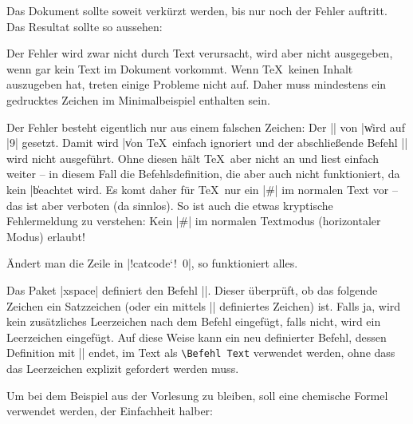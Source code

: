 
Das Dokument sollte soweit verkürzt werden, bis nur noch der Fehler auftritt. Das Resultat sollte so aussehen:
Der Fehler wird zwar nicht durch Text verursacht, wird aber nicht ausgegeben, wenn gar kein Text im Dokument vorkommt. Wenn \TeX\ keinen Inhalt auszugeben hat, treten einige Probleme nicht auf. Daher muss mindestens ein gedrucktes Zeichen im Minimalbeispiel enthalten sein.
\stopsolution

Der Fehler besteht eigentlich nur aus einem falschen Zeichen: Der |\catcode| von |\| wird auf |9| gesetzt. Damit wird |\| von \TeX\ einfach ignoriert und der abschließende Befehl |\enddocument| wird nicht ausgeführt. Ohne diesen hält \TeX\ aber nicht an und liest einfach weiter – in diesem Fall die Befehlsdefinition, die aber auch nicht funktioniert, da kein |\| beachtet wird. Es komt daher für \TeX\ nur ein |#| im normalen Text vor – das ist aber verboten (da sinnlos). So ist auch die etwas kryptische Fehlermeldung zu verstehen: Kein |#| im normalen Textmodus (horizontaler Modus) erlaubt!

Ändert man die Zeile in |!catcode`!\ 0|, so funktioniert alles.
\stopsolution

Das Paket |xspace| definiert den Befehl |\xspace|. Dieser überprüft, ob das folgende Zeichen ein Satzzeichen (oder ein mittels |\xspaceaddexceptions| definiertes Zeichen) ist. Falls ja, wird kein zusätzliches Leerzeichen nach dem Befehl eingefügt, falls nicht, wird ein Leerzeichen eingefügt. Auf diese Weise kann ein neu definierter Befehl, dessen Definition mit |\xspace| endet, im Text als \verb*|\Befehl Text| verwendet werden, ohne dass das Leerzeichen explizit gefordert werden muss.

Um bei dem Beispiel aus der Vorlesung zu bleiben, soll eine chemische Formel verwendet werden, der Einfachheit halber:\\

